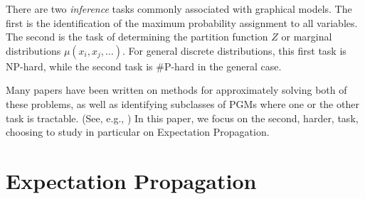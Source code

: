 \documentclass[times, 10pt,twocolumn]{article}
\begin{document}
There are two \textit{inference} tasks commonly associated with
graphical models. The first is the identification of the maximum
probability assignment to all variables. The second is the task of
determining the partition function $Z$ or marginal distributions
$\mu(x_i, x_j, \ldots)$.  For general discrete distributions, this
first task is NP-hard, while the second task is \#P-hard in the
general case.

Many papers have been written on methods for approximately solving
both of these problems, as well as identifying subclasses of PGMs
where one or the other task is tractable. (See, e.g.,
\cite{taskar03m3n})
In this paper, we focus on the second, harder, task, choosing to
study in particular on Expectation Propagation\cite{Minka01}.

\section{Expectation Propagation}
\end{document}

